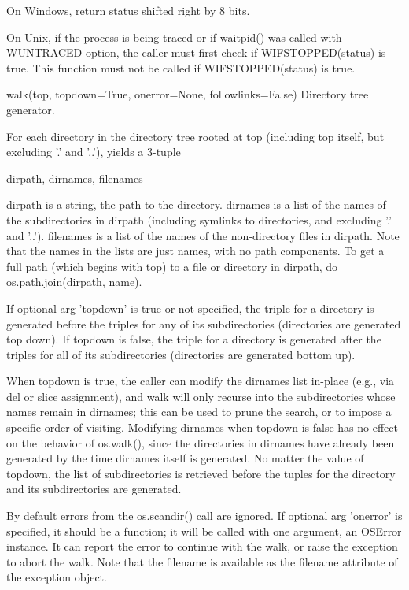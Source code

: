\documentclass{article}
\begin{document}
        On Windows, return status shifted right by 8 bits.

        On Unix, if the process is being traced or if waitpid() was called with
        WUNTRACED option, the caller must first check if WIFSTOPPED(status) is true.
        This function must not be called if WIFSTOPPED(status) is true.

    walk(top, topdown=True, onerror=None, followlinks=False)
        Directory tree generator.

        For each directory in the directory tree rooted at top (including top
        itself, but excluding '.' and '..'), yields a 3-tuple

            dirpath, dirnames, filenames

        dirpath is a string, the path to the directory.  dirnames is a list of
        the names of the subdirectories in dirpath (including symlinks to directories,
        and excluding '.' and '..').
        filenames is a list of the names of the non-directory files in dirpath.
        Note that the names in the lists are just names, with no path components.
        To get a full path (which begins with top) to a file or directory in
        dirpath, do os.path.join(dirpath, name).

        If optional arg 'topdown' is true or not specified, the triple for a
        directory is generated before the triples for any of its subdirectories
        (directories are generated top down).  If topdown is false, the triple
        for a directory is generated after the triples for all of its
        subdirectories (directories are generated bottom up).

        When topdown is true, the caller can modify the dirnames list in-place
        (e.g., via del or slice assignment), and walk will only recurse into the
        subdirectories whose names remain in dirnames; this can be used to prune the
        search, or to impose a specific order of visiting.  Modifying dirnames when
        topdown is false has no effect on the behavior of os.walk(), since the
        directories in dirnames have already been generated by the time dirnames
        itself is generated. No matter the value of topdown, the list of
        subdirectories is retrieved before the tuples for the directory and its
        subdirectories are generated.

        By default errors from the os.scandir() call are ignored.  If
        optional arg 'onerror' is specified, it should be a function; it
        will be called with one argument, an OSError instance.  It can
        report the error to continue with the walk, or raise the exception
        to abort the walk.  Note that the filename is available as the
        filename attribute of the exception object.
\end{document}

